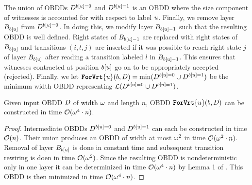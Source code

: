 The union of OBDDs $D^{b[u]=0}$ and $D^{b[u]=1}$ is an OBDD where the size component of witnesses is accounted for with respect to label $u$. Finally, we remove layer $B_{b[u]}$ from $D^{b[u]=0}$. In doing this, we modify layer $B_{b[u]-1}$ such that the resulting OBDD is well defined. Right states of $B_{b[u]-1}$ are replaced with right states of $B_{b[u]}$ and transitions $(i,l,j)$ are inserted if it was possible to reach right state $j$ of layer $B_{b[u]}$ after reading a transition labeled $l$ in $B_{b[u]-1}$. This ensures that witnesses contracted at position $b[u]$ go on to be appropriately accepted (rejected). 
Finally, we let $\texttt{\textbf{ForVrt}}\{u\}(b, D) = \mathrm{min}(D^{b[u]=0}\cup D^{b[u]=1})$ be the minimum width OBDD representing $\mathcal{L}(D^{b[u]=0}\cup D^{b[u]=1})$.

\begin{proposition}\label{forgettime}
    Given input OBDD $D$ of width $\omega$ and length $n$, OBDD $\texttt{\textbf{ForVrt}}\{u\}(b, D)$ can be constructed in time $\mathcal{O}(\omega^4 \cdot n)$. 
\end{proposition}
\begin{proof}
    Intermediate OBDDs $D^{b[u]=0}$ and $D^{b[u]=1}$ can each be constructed in time $\mathcal{O}(n)$. Their union produces an OBDD of width at most $\omega^2$ in time $\mathcal{O}(\omega^2\cdot n)$. Removal of layer $B_{b[u]}$ is done in constant time and subsequent transition rewiring is doen in time $\mathcal{O}(\omega^2)$. Since the resulting OBDD is nondeterministic only in one layer it can be determinized in time $\mathcal{O}(\omega^4 \cdot n)$ by Lemma 1 of \cite{alferov2022}. This OBDD is then minimized in time $\mathcal{O}(\omega^4 \cdot n)$.  
\end{proof}


